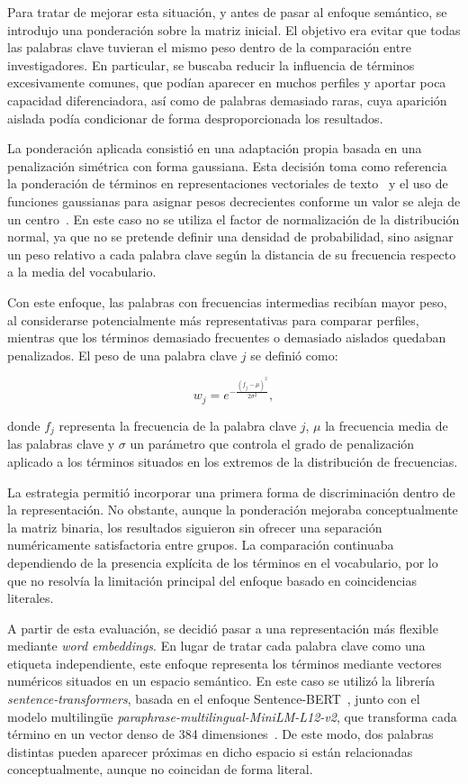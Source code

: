 \documentclass[11pt,spanish,listoffigures,listoftables]{tfgetsinf}
\begin{document}
Para tratar de mejorar esta situación, y antes de pasar al enfoque semántico, se introdujo una ponderación sobre la matriz inicial. El objetivo era evitar que todas las palabras clave tuvieran el mismo peso dentro de la comparación entre investigadores. En particular, se buscaba reducir la influencia de términos excesivamente comunes, que podían aparecer en muchos perfiles y aportar poca capacidad diferenciadora, así como de palabras demasiado raras, cuya aparición aislada podía condicionar de forma desproporcionada los resultados.

La ponderación aplicada consistió en una adaptación propia basada en una penalización simétrica con forma gaussiana. Esta decisión toma como referencia la ponderación de términos en representaciones vectoriales de texto~\cite{salton} y el uso de funciones gaussianas para asignar pesos decrecientes conforme un valor se aleja de un centro~\cite{gaussian_function}. En este caso no se utiliza el factor de normalización de la distribución normal, ya que no se pretende definir una densidad de probabilidad, sino asignar un peso relativo a cada palabra clave según la distancia de su frecuencia respecto a la media del vocabulario.

Con este enfoque, las palabras con frecuencias intermedias recibían mayor peso, al considerarse potencialmente más representativas para comparar perfiles, mientras que los términos demasiado frecuentes o demasiado aislados quedaban penalizados. El peso de una palabra clave \(j\) se definió como:

\[
w_j = e^{-\frac{(f_j - \mu)^2}{2\sigma^2}},
\]

donde \(f_j\) representa la frecuencia de la palabra clave \(j\), \(\mu\) la frecuencia media de las palabras clave y \(\sigma\) un parámetro que controla el grado de penalización aplicado a los términos situados en los extremos de la distribución de frecuencias.

La estrategia permitió incorporar una primera forma de discriminación dentro de la representación. No obstante, aunque la ponderación mejoraba conceptualmente la matriz binaria, los resultados siguieron sin ofrecer una separación numéricamente satisfactoria entre grupos. La comparación continuaba dependiendo de la presencia explícita de los términos en el vocabulario, por lo que no resolvía la limitación principal del enfoque basado en coincidencias literales.

A partir de esta evaluación, se decidió pasar a una representación más flexible mediante \textit{word embeddings}. En lugar de tratar cada palabra clave como una etiqueta independiente, este enfoque representa los términos mediante vectores numéricos situados en un espacio semántico. En este caso se utilizó la librería \textit{sentence-transformers}, basada en el enfoque Sentence-BERT~\cite{sentencebert}, junto con el modelo multilingüe \textit{paraphrase-multilingual-MiniLM-L12-v2}, que transforma cada término en un vector denso de 384 dimensiones~\cite{minilm_multilingual}. De este modo, dos palabras distintas pueden aparecer próximas en dicho espacio si están relacionadas conceptualmente, aunque no coincidan de forma literal.
\end{document}
